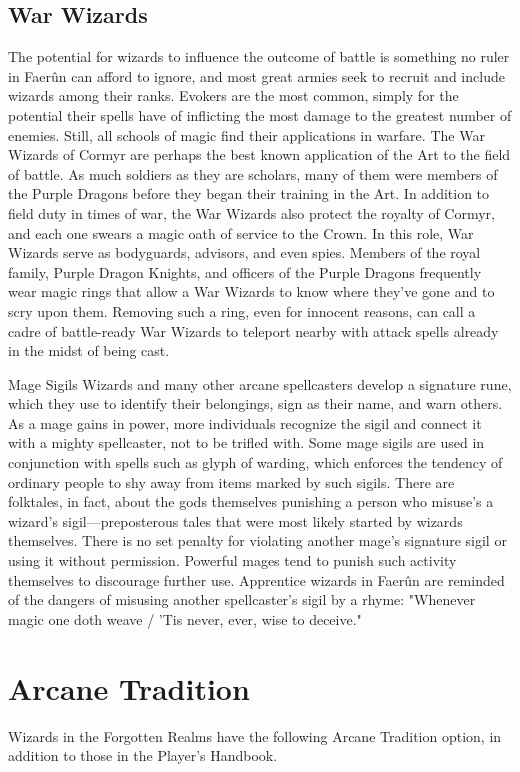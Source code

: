 \documentclass[10pt,a4paper,twoside,twocolumn,openany,bg=print,nodeprecatedcode]{dndbook}
\begin{document}
\subsection{War Wizards}
The potential for wizards to influence the outcome of battle is something no ruler in Faerûn can afford to ignore, and most great armies seek to recruit and include wizards among their ranks. Evokers are the most common, simply for the potential their spells have of inflicting the most damage to the greatest number of enemies. Still, all schools of magic find their applications in warfare.
The War Wizards of Cormyr are perhaps the best known application of the Art to the field of battle. As much soldiers as they are scholars, many of them were members of the Purple Dragons before they began their training in the Art. In addition to field duty in times of war, the War Wizards also protect the royalty of Cormyr, and each one swears a magic oath of service to the Crown. In this role, War Wizards serve as bodyguards, advisors, and even spies. Members of the royal family, Purple Dragon Knights, and officers of the Purple Dragons frequently wear magic rings that allow a War Wizards to know where they've gone and to scry upon them. Removing such a ring, even for innocent reasons, can call a cadre of battle-ready War Wizards to teleport nearby with attack spells already in the midst of being cast.
\begin{DndComment}{Mage Sigils}
Wizards and many other arcane spellcasters develop a signature rune, which they use to identify their belongings, sign as their name, and warn others. As a mage gains in power, more individuals recognize the sigil and connect it with a mighty spellcaster, not to be trifled with. Some mage sigils are used in conjunction with spells such as glyph of warding, which enforces the tendency of ordinary people to shy away from items marked by such sigils. There are folktales, in fact, about the gods themselves punishing a person who misuse's a wizard's sigil—preposterous tales that were most likely started by wizards themselves. There is no set penalty for violating another mage's signature sigil or using it without permission. Powerful mages tend to punish such activity themselves to discourage further use.
Apprentice wizards in Faerûn are reminded of the dangers of misusing another spellcaster's sigil by a rhyme: "Whenever magic one doth weave / 'Tis never, ever, wise to deceive."
\end{DndComment}

\section{Arcane Tradition}
Wizards in the Forgotten Realms have the following Arcane Tradition option, in addition to those in the Player's Handbook.
\end{document}

